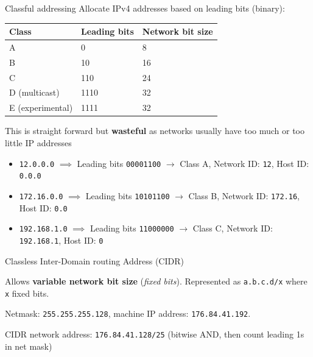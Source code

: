 \begin{knBox}
    {Classful addressing}
    Allocate IPv4 addresses based on leading bits (binary):

    \begin{tabular}{l|l|l}
        \textbf{Class}   & \textbf{Leading bits} & \textbf{Network bit size} \\
        \hline
        A                & 0                     & 8                         \\
        B                & 10                    & 16                        \\
        C                & 110                   & 24                        \\
        D (multicast)    & 1110                  & 32                        \\
        E (experimental) & 1111                  & 32                        \\
    \end{tabular}

    This is straight forward but \textbf{wasteful} as networks usually have too much or too little IP addresses

    \tcblower

    \begin{itemize}
        \item \texttt{12.0.0.0} $\implies$ Leading bits \texttt{00001100} $\to$ Class A, Network ID: \texttt{12}, Host ID: \texttt{0.0.0}
        \item \texttt{172.16.0.0} $\implies$ Leading bits \texttt{10101100} $\to$ Class B, Network ID: \texttt{172.16}, Host ID: \texttt{0.0}
        \item \texttt{192.168.1.0} $\implies$ Leading bits \texttt{11000000} $\to$ Class C, Network ID: \texttt{192.168.1}, Host ID: \texttt{0}
    \end{itemize}
\end{knBox}

\begin{definition}
    {Classless Inter-Domain routing Address (CIDR)}

    Allows \textbf{variable network bit size} (\textit{fixed bits}). Represented as \texttt{a.b.c.d/x} where \texttt{x} fixed bits.

    \tcblower

    Netmask: \texttt{255.255.255.128}, machine IP address: \texttt{176.84.41.192}.

    CIDR network address: \texttt{176.84.41.128/25} (bitwise AND, then count leading 1s in net mask)
\end{definition}

